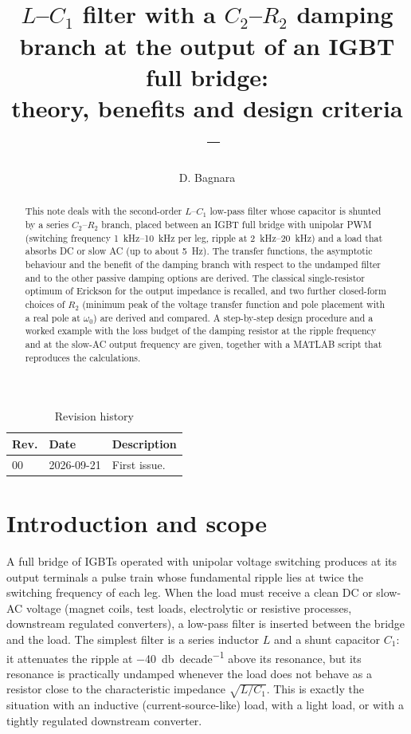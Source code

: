\documentclass[11pt,a4paper]{article}
\title{\doctitle\\[2mm]
\large $L$--$C_1$ filter with a $C_2$--$R_2$ damping branch at the output of an IGBT full bridge:\\
theory, benefits and design criteria\\[3mm]
\normalsize \docrev\ -- \docdate}
\author{D. Bagnara}
\date{}
\begin{document}
\maketitle
\thispagestyle{fancy}

\begin{abstract}
\noindent
This note deals with the second-order $L$--$C_1$ low-pass filter whose capacitor is
shunted by a series $C_2$--$R_2$ branch, placed between an IGBT full bridge with unipolar
PWM (switching frequency \SIrange{1}{10}{\kilo\hertz} per leg, ripple at
\SIrange{2}{20}{\kilo\hertz}) and a load that absorbs DC or slow AC (up to about
\SI{5}{\hertz}). The transfer functions, the asymptotic behaviour and the benefit of the
damping branch with respect to the undamped filter and to the other passive damping
options are derived. The classical single-resistor optimum of Erickson for the output
impedance is recalled, and two further closed-form choices of $R_2$ (minimum peak of the
voltage transfer function and pole placement with a real pole at $\omega_0$) are derived
and compared. A step-by-step design procedure and a worked example with the loss budget of
the damping resistor at the ripple frequency and at the slow-AC output frequency are given,
together with a MATLAB script that reproduces the calculations.
\end{abstract}

\begin{table}[h]
\centering
\small
\caption{Revision history}
\begin{tabular}{llp{9cm}}
\toprule
Rev. & Date & Description \\
\midrule
00 & 2026-09-21 & First issue. \\
\bottomrule
\end{tabular}
\end{table}

\tableofcontents

\section{Introduction and scope}

A full bridge of IGBTs operated with unipolar voltage switching produces at its output
terminals a pulse train whose fundamental ripple lies at twice the switching frequency of
each leg. When the load must receive a clean DC or slow-AC voltage (magnet coils, test
loads, electrolytic or resistive processes, downstream regulated converters), a low-pass
filter is inserted between the bridge and the load. The simplest filter is a series
inductor $L$ and a shunt capacitor $C_1$: it attenuates the ripple at
\SI{-40}{\decibel\per decade} above its resonance, but its resonance is practically
undamped whenever the load does not behave as a resistor close to the characteristic
impedance $\sqrt{L/C_1}$. This is exactly the situation with an inductive (current-source-like)
load, with a light load, or with a tightly regulated downstream converter.
\end{document}

